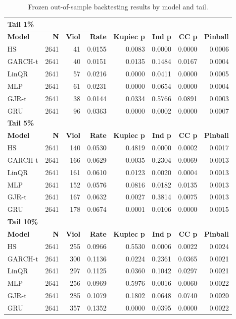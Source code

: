 \documentclass[11pt]{article}
\begin{document}
\begin{table}[ht]
\centering
\caption{Frozen out-of-sample backtesting results by model and tail.}\label{tab:metrics}
\small\begin{tabular}{lrrrrrrr}
\hline
\multicolumn{8}{l}{\textbf{Tail 1\%}}\\
\hline
\textbf{Model} & \textbf{N} & \textbf{Viol} & \textbf{Rate} & \textbf{Kupiec p} & \textbf{Ind p} & \textbf{CC p} & \textbf{Pinball}\\
HS & 2641 & 41 & 0.0155 & 0.0083 & 0.0000 & 0.0000 & 0.0006\\
GARCH-t & 2641 & 40 & 0.0151 & 0.0135 & 0.1484 & 0.0167 & 0.0004\\
LinQR & 2641 & 57 & 0.0216 & 0.0000 & 0.0411 & 0.0000 & 0.0005\\
MLP & 2641 & 61 & 0.0231 & 0.0000 & 0.0654 & 0.0000 & 0.0004\\
GJR-t & 2641 & 38 & 0.0144 & 0.0334 & 0.5766 & 0.0891 & 0.0003\\
GRU & 2641 & 96 & 0.0363 & 0.0000 & 0.0002 & 0.0000 & 0.0007\\
\hline
\multicolumn{8}{l}{\textbf{Tail 5\%}}\\
\hline
\textbf{Model} & \textbf{N} & \textbf{Viol} & \textbf{Rate} & \textbf{Kupiec p} & \textbf{Ind p} & \textbf{CC p} & \textbf{Pinball}\\
HS & 2641 & 140 & 0.0530 & 0.4819 & 0.0000 & 0.0002 & 0.0017\\
GARCH-t & 2641 & 166 & 0.0629 & 0.0035 & 0.2304 & 0.0069 & 0.0013\\
LinQR & 2641 & 161 & 0.0610 & 0.0123 & 0.0020 & 0.0004 & 0.0013\\
MLP & 2641 & 152 & 0.0576 & 0.0816 & 0.0182 & 0.0135 & 0.0013\\
GJR-t & 2641 & 167 & 0.0632 & 0.0027 & 0.3814 & 0.0075 & 0.0013\\
GRU & 2641 & 178 & 0.0674 & 0.0001 & 0.0106 & 0.0000 & 0.0015\\
\hline
\multicolumn{8}{l}{\textbf{Tail 10\%}}\\
\hline
\textbf{Model} & \textbf{N} & \textbf{Viol} & \textbf{Rate} & \textbf{Kupiec p} & \textbf{Ind p} & \textbf{CC p} & \textbf{Pinball}\\
HS & 2641 & 255 & 0.0966 & 0.5530 & 0.0006 & 0.0022 & 0.0024\\
GARCH-t & 2641 & 300 & 0.1136 & 0.0224 & 0.2361 & 0.0365 & 0.0021\\
LinQR & 2641 & 297 & 0.1125 & 0.0360 & 0.1042 & 0.0297 & 0.0021\\
MLP & 2641 & 256 & 0.0969 & 0.5976 & 0.0016 & 0.0060 & 0.0022\\
GJR-t & 2641 & 285 & 0.1079 & 0.1802 & 0.0648 & 0.0740 & 0.0020\\
GRU & 2641 & 357 & 0.1352 & 0.0000 & 0.0395 & 0.0000 & 0.0022\\
\hline
\end{tabular}
\end{table}
\end{document}
